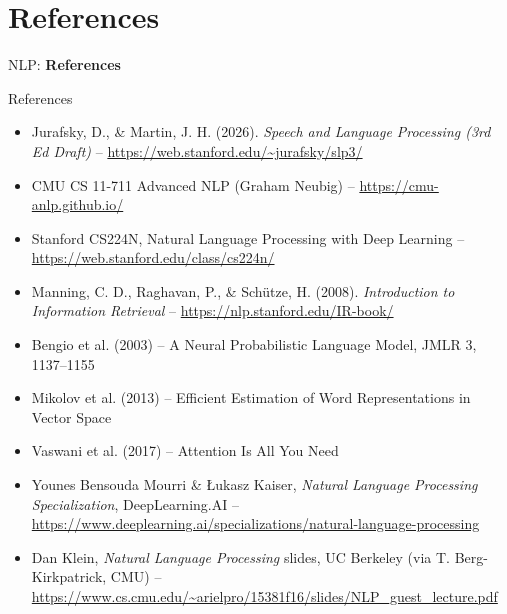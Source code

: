 \section{References}
\begin{frame}{}
    \LARGE NLP: \textbf{References}
\end{frame}

\begin{frame}[allowframebreaks]{References}
    \small
    \begin{itemize}
        \item Jurafsky, D., \& Martin, J. H. (2026). \textit{Speech and Language Processing (3rd Ed Draft)} – \url{https://web.stanford.edu/~jurafsky/slp3/}
        \item CMU CS 11-711 Advanced NLP (Graham Neubig) – \url{https://cmu-anlp.github.io/}
        \item Stanford CS224N, Natural Language Processing with Deep Learning – \url{https://web.stanford.edu/class/cs224n/}
        \item Manning, C. D., Raghavan, P., \& Sch\"utze, H. (2008). \textit{Introduction to Information Retrieval} – \url{https://nlp.stanford.edu/IR-book/}
        \item Bengio et al. (2003) – A Neural Probabilistic Language Model, JMLR 3, 1137--1155
        \item Mikolov et al. (2013) – Efficient Estimation of Word Representations in Vector Space
        \item Vaswani et al. (2017) – Attention Is All You Need
        \item Younes Bensouda Mourri \& \L{}ukasz Kaiser, \textit{Natural Language Processing Specialization}, DeepLearning.AI – \url{https://www.deeplearning.ai/specializations/natural-language-processing}
        \item Dan Klein, \textit{Natural Language Processing} slides, UC Berkeley (via T. Berg-Kirkpatrick, CMU) – \url{https://www.cs.cmu.edu/~arielpro/15381f16/slides/NLP_guest_lecture.pdf}
    \end{itemize}
\end{frame}